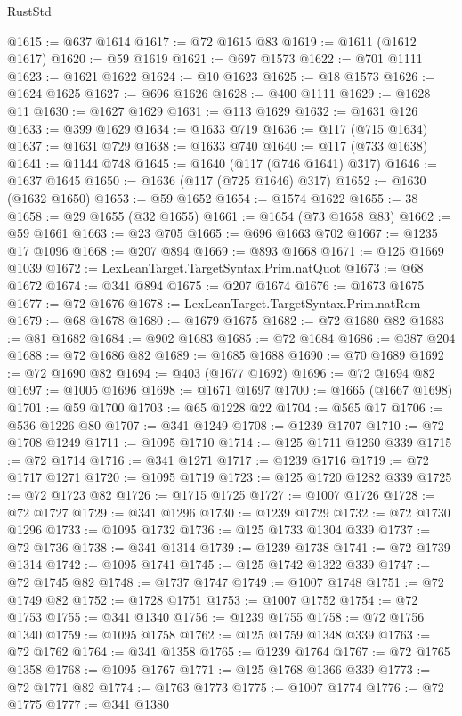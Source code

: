 \begin{lexlean}{RustStd}
\begin{coremodule}
@1615 := @637 @1614
@1617 := @72 @1615 @83
@1619 := @1611 (@1612 @1617)
@1620 := @59 @1619
@1621 := @697 @1573
@1622 := @701 @1111
@1623 := @1621 @1622
@1624 := @10 @1623
@1625 := @18 @1573
@1626 := @1624 @1625
@1627 := @696 @1626
@1628 := @400 @1111
@1629 := @1628 @11
@1630 := @1627 @1629
@1631 := @113 @1629
@1632 := @1631 @126
@1633 := @399 @1629
@1634 := @1633 @719
@1636 := @117 (@715 @1634)
@1637 := @1631 @729
@1638 := @1633 @740
@1640 := @117 (@733 @1638)
@1641 := @1144 @748
@1645 := @1640 (@117 (@746 @1641) @317)
@1646 := @1637 @1645
@1650 := @1636 (@117 (@725 @1646) @317)
@1652 := @1630 (@1632 @1650)
@1653 := @59 @1652
@1654 := @1574 @1622
@1655 := 38
@1658 := @29 @1655 (@32 @1655)
@1661 := @1654 (@73 @1658 @83)
@1662 := @59 @1661
@1663 := @23 @705
@1665 := @696 @1663 @702
@1667 := @1235 @17 @1096
@1668 := @207 @894
@1669 := @893 @1668
@1671 := @125 @1669 @1039
@1672 := LexLeanTarget.TargetSyntax.Prim.natQuot
@1673 := @68 @1672
@1674 := @341 @894
@1675 := @207 @1674
@1676 := @1673 @1675
@1677 := @72 @1676
@1678 := LexLeanTarget.TargetSyntax.Prim.natRem
@1679 := @68 @1678
@1680 := @1679 @1675
@1682 := @72 @1680 @82
@1683 := @81 @1682
@1684 := @902 @1683
@1685 := @72 @1684
@1686 := @387 @204
@1688 := @72 @1686 @82
@1689 := @1685 @1688
@1690 := @70 @1689
@1692 := @72 @1690 @82
@1694 := @403 (@1677 @1692)
@1696 := @72 @1694 @82
@1697 := @1005 @1696
@1698 := @1671 @1697
@1700 := @1665 (@1667 @1698)
@1701 := @59 @1700
@1703 := @65 @1228 @22
@1704 := @565 @17
@1706 := @536 @1226 @80
@1707 := @341 @1249
@1708 := @1239 @1707
@1710 := @72 @1708 @1249
@1711 := @1095 @1710
@1714 := @125 @1711 @1260 @339
@1715 := @72 @1714
@1716 := @341 @1271
@1717 := @1239 @1716
@1719 := @72 @1717 @1271
@1720 := @1095 @1719
@1723 := @125 @1720 @1282 @339
@1725 := @72 @1723 @82
@1726 := @1715 @1725
@1727 := @1007 @1726
@1728 := @72 @1727
@1729 := @341 @1296
@1730 := @1239 @1729
@1732 := @72 @1730 @1296
@1733 := @1095 @1732
@1736 := @125 @1733 @1304 @339
@1737 := @72 @1736
@1738 := @341 @1314
@1739 := @1239 @1738
@1741 := @72 @1739 @1314
@1742 := @1095 @1741
@1745 := @125 @1742 @1322 @339
@1747 := @72 @1745 @82
@1748 := @1737 @1747
@1749 := @1007 @1748
@1751 := @72 @1749 @82
@1752 := @1728 @1751
@1753 := @1007 @1752
@1754 := @72 @1753
@1755 := @341 @1340
@1756 := @1239 @1755
@1758 := @72 @1756 @1340
@1759 := @1095 @1758
@1762 := @125 @1759 @1348 @339
@1763 := @72 @1762
@1764 := @341 @1358
@1765 := @1239 @1764
@1767 := @72 @1765 @1358
@1768 := @1095 @1767
@1771 := @125 @1768 @1366 @339
@1773 := @72 @1771 @82
@1774 := @1763 @1773
@1775 := @1007 @1774
@1776 := @72 @1775
@1777 := @341 @1380

\end{coremodule}
\end{lexlean}
